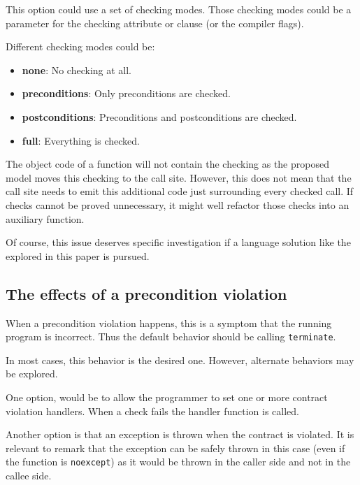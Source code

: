 This option could use a set of checking modes. Those checking modes could be a
parameter for the checking attribute or clause (or the compiler flags).

Different checking modes could be:

\begin{itemize}

\item \textbf{none}: No checking at all.

\item \textbf{preconditions}: Only preconditions are checked.

\item \textbf{postconditions}: Preconditions and postconditions are checked.

\item \textbf{full}: Everything is checked.

\end{itemize}


The object code of a function will not contain the checking as the proposed
model moves this checking to the call site. However, this does not mean that
the call site needs to emit this additional code just surrounding every checked
call. If checks cannot be proved unnecessary, it might well refactor those
checks into an auxiliary function.

Of course, this issue deserves specific investigation if a language solution
like the explored in this paper is pursued.

\subsection{The effects of a precondition violation}

When a precondition violation happens, this is a symptom that the running
program is incorrect. Thus the default behavior should be calling
\texttt{terminate}.

In most cases, this behavior is the desired one. However, alternate behaviors
may be explored.

One option, would be to allow the programmer to set one or more contract
violation handlers. When a check fails the handler function is called.

Another option is that an exception is thrown when the contract is violated. It
is relevant to remark that the exception can be safely thrown in this case (even
if the function is \texttt{noexcept}) as it would be thrown in the caller side
and not in the callee side.

